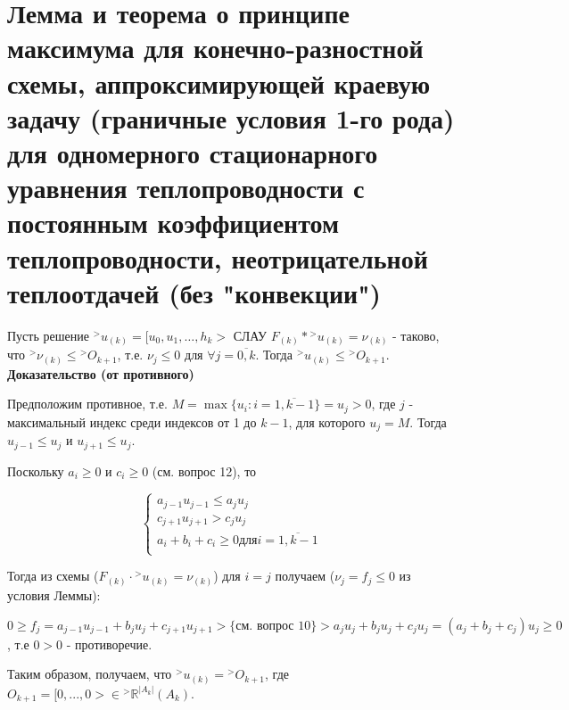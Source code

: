 \documentclass[__main__.tex]{subfiles}
\begin{document}
\section{Лемма и теорема о принципе максимума для конечно-разностной схемы, аппроксимирующей краевую задачу (граничные условия 1-го рода) для одномерного стационарного уравнения теплопроводности с постоянным коэффициентом теплопроводности, неотрицательной теплоотдачей (без "конвекции")}

Пусть решение ${}^{>}u_{(k)} = [u_0, u_1, \hdots, h_k>$ СЛАУ $F_(k) * {}^{>}u_(k) = \nu_{(k)}$ - таково, что ${}^{>}\nu_{(k)} \le {}^{>}O_{k+1}$, т.е. $\nu_j \le 0$ для $\forall j = \overline{0, k}$. Тогда ${}^{>}u_{(k)} \le {}^{>}O_{k+1}$.
\textbf{Доказательство (от противного)}

Предположим противное, т.е. $M = \max\{u_i: i = \overline{1, k - 1}\} = u_j > 0$, где $j$ - максимальный индекс среди индексов от 1 до $k-1$, для которого $u_j = M$. Тогда $u_{j-1} \le u_j$ и $u_{j+1} \le u_j$.

Поскольку $a_i \ge 0$ и $c_i \ge 0$ (см. вопрос 12), то

\begin{equation}
\begin{cases}
a_{j - 1} u_{j - 1} \le a_j u_j \\
c_{j + 1} u_{j + 1} > c_j u_j \\
a_i + b_i + c_i \ge 0 \text{для} i = \overline{1, k - 1}\\
\end{cases}
\end{equation}

Тогда из схемы ($F_{(k)} \cdot {}^{>}u_(k) = \nu_{(k)}$) для $i = j$ получаем ($\nu_j = f_j \le 0$ из условия Леммы):

$$0 \ge f_j = a_{j - 1} u_{j - 1} + b_j u_j + c_{j + 1} u_{j + 1} >\{\text{см. вопрос 10}\} > a_j u_j + b_j u_j + c_j u_j = (a_j + b_j + c_j)u_j \ge 0$$
, т.е $0 > 0$ - противоречие.

Таким образом, получаем, что ${}^{>}u_{(k)} = {}^{>}O_{k+1}$, где $O_{k+1} = [0, ..., 0> \in {}^{>}\mathbb{R}^{|A_k|}(A_k)$.
\end{document}
